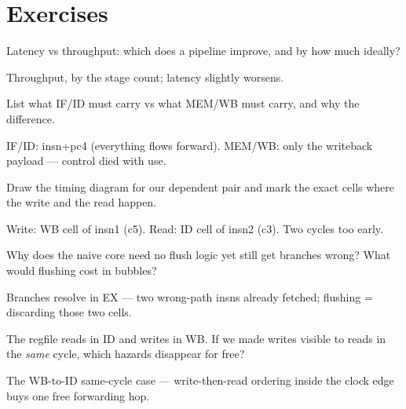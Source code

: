 \section{Exercises}
\label{sec:exercises06}

\begin{exercise}[easy]\label{ex:e06a}
Latency vs throughput: which does a pipeline improve, and by how
much ideally?
\end{exercise}
\begin{solution}[hint]
Throughput, by the stage count; latency slightly worsens.
\end{solution}

\begin{exercise}[easy]\label{ex:e06b}
List what IF/ID must carry vs what MEM/WB must carry, and why the
difference.
\end{exercise}
\begin{solution}[hint]
IF/ID: insn+pc4 (everything flows forward). MEM/WB: only the
writeback payload --- control died with use.
\end{solution}

\begin{exercise}[medium]\label{ex:m06a}
Draw the timing diagram for our dependent pair and mark the exact
cells where the write and the read happen.
\end{exercise}
\begin{solution}[hint]
Write: WB cell of insn1 (c5). Read: ID cell of insn2 (c3). Two
cycles too early.
\end{solution}

\begin{exercise}[medium]\label{ex:m06b}
Why does the naive core need no flush logic yet still get branches
wrong? What would flushing cost in bubbles?
\end{exercise}
\begin{solution}[hint]
Branches resolve in EX --- two wrong-path insns already fetched;
flushing = discarding those two cells.
\end{solution}

\begin{exercise}[medium]\label{ex:m06c}
The regfile reads in ID and writes in WB. If we made writes visible
to reads in the \emph{same} cycle, which hazards disappear for free?
\end{exercise}
\begin{solution}[hint]
The WB-to-ID same-cycle case --- write-then-read ordering inside the
clock edge buys one free forwarding hop.
\end{solution}

